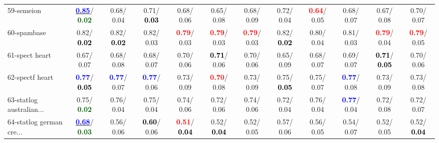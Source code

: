 \begin{table}[h]
\begin{center}
{\begin{tabular}{lc|c|c|c|c|c|c|c|c|c|c}
59-semeion & \underline{\textcolor{blue}{\textbf{  0.85}}}/\textcolor{darkgreen}{\textbf{  0.02}} &   0.68/  0.04 &   0.71/\textcolor{black}{\textbf{  0.03}} &   0.68/  0.06 &   0.65/  0.08 &   0.68/  0.09 &   0.72/  0.04 & \textcolor{red}{\textbf{  0.64}}/  0.05 &   0.68/  0.07 &   0.67/  0.08 &   0.70/  0.07 \\
60-spambase &   0.82/\textcolor{black}{\textbf{  0.02}} &   0.82/\textcolor{black}{\textbf{  0.02}} &   0.82/  0.03 & \textcolor{red}{\textbf{  0.79}}/  0.03 & \textcolor{red}{\textbf{  0.79}}/  0.03 & \textcolor{red}{\textbf{  0.79}}/  0.03 &   0.82/\textcolor{black}{\textbf{  0.02}} &   0.80/  0.04 &   0.81/  0.03 & \textcolor{red}{\textbf{  0.79}}/  0.04 & \textcolor{red}{\textbf{  0.79}}/  0.05 \\ \hline
61-spect heart &   0.67/  0.07 &   0.68/  0.08 &   0.68/  0.07 &   0.70/  0.06 & \textcolor{black}{\textbf{  0.71}}/  0.06 &   0.70/  0.06 &   0.65/  0.09 &   0.68/  0.07 &   0.69/  0.07 & \textcolor{black}{\textbf{  0.71}}/\textcolor{black}{\textbf{  0.05}} &   0.70/  0.06 \\
62-spectf heart & \textcolor{blue}{\textbf{  0.77}}/\textcolor{black}{\textbf{  0.05}} & \textcolor{blue}{\textbf{  0.77}}/  0.07 & \textcolor{blue}{\textbf{  0.77}}/  0.06 &   0.73/  0.09 & \textcolor{red}{\textbf{  0.70}}/  0.08 &   0.73/  0.09 &   0.75/\textcolor{black}{\textbf{  0.05}} &   0.75/  0.07 & \textcolor{blue}{\textbf{  0.77}}/  0.08 &   0.73/  0.09 &   0.73/  0.08 \\
63-statlog australian... &   0.75/\textcolor{darkgreen}{\textbf{  0.02}} &   0.76/  0.04 &   0.75/  0.04 &   0.74/  0.06 &   0.72/  0.06 &   0.74/  0.06 &   0.72/  0.04 &   0.76/  0.04 & \textcolor{blue}{\textbf{  0.77}}/  0.04 &   0.72/  0.08 &   0.72/  0.07 \\
64-statlog german cre... & \underline{\textcolor{blue}{\textbf{  0.68}}}/\textcolor{darkgreen}{\textbf{  0.03}} &   0.56/  0.06 & \textcolor{black}{\textbf{  0.60}}/  0.06 & \textcolor{red}{\textbf{  0.51}}/\textcolor{black}{\textbf{  0.04}} &   0.52/\textcolor{black}{\textbf{  0.04}} &   0.52/  0.05 &   0.57/  0.06 &   0.56/  0.05 &   0.54/  0.07 &   0.52/  0.05 &   0.52/\textcolor{black}{\textbf{  0.04}} \\\end{tabular}}\label{stratsBalAcc1aNB}
\end{center}
\end{table}

